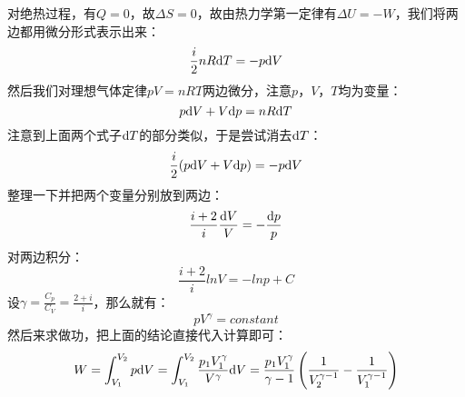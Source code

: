         \begin{prove}
            对绝热过程，有$Q = 0$，故$\Delta S = 0$，故由热力学第一定律有$\Delta U = -W$，我们将两边都用微分形式表示出来：
            \begin{equation}
                \frac{i}{2}nR\mathrm{d}{T} = -p\mathrm{d}{V} 
                \nonumber
            \end{equation}
            然后我们对理想气体定律$pV = nRT$两边微分，注意$p$，$V$，$T$均为变量：
            \begin{equation}
                p\mathrm{d}{V} + V\mathrm{d}{p} = nR \mathrm{d}{T}
                \nonumber
            \end{equation}
            注意到上面两个式子$\mathrm{d}{T}$的部分类似，于是尝试消去$\mathrm{d}{T}$：
            \begin{equation}
                \frac{i}{2} (p\mathrm{d}{V} + V\mathrm{d}{p}) = -p\mathrm{d}{V}
                \nonumber
            \end{equation}
            整理一下并把两个变量分别放到两边：
            \begin{equation}
                \frac{i+2}{i} \frac{\mathrm{d}{V}}{V}  = -\frac{\mathrm{d}{p}}{p}
                \nonumber
            \end{equation}
            对两边积分：
            \begin{equation}
                \frac{i+2}{i} lnV  =-lnp + C
                \nonumber
            \end{equation}
            设$\gamma = \frac{C_p}{C_V} = \frac{2+i}{i}$，那么就有：
            \begin{equation}
                pV^{\gamma} = constant
            \end{equation}
            然后来求做功，把上面的结论直接代入计算即可：
            \begin{equation}
                W = \int_{V_1}^{V_2} p\mathrm{d}{V} =\int_{V_1}^{V_2} \frac{p_{1}V_{1}^{\gamma}}{V^{\gamma}}\mathrm{d}{V}
                  = \frac{p_{1}V_{1}^{\gamma}}{\gamma - 1}\left(\frac{1}{V_{2}^{\gamma-1}}-\frac{1}{V_1^{\gamma-1}}\right)
            \end{equation}
        \end{prove}
